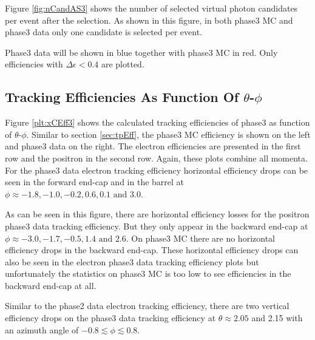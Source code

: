 \documentclass[a4paper,11pt,twosided,final,german,openbib,pdftex,listof=totoc,bibliography=totoc]{scrbook}
\begin{document}
Figure \ref{fig:nCandAS3} shows the number of selected virtual photon candidates per event after the selection. As shown in this figure, in both phase3 MC and phase3 data only one candidate is selected per event.




Phase3 data will be shown in blue together with phase3 MC in red. Only efficiencies with $\Delta \epsilon < 0.4$ are plotted.


\subsection{Tracking Efficiencies As Function Of $\theta$-$\phi$}
\label{sec:tpEff3}

Figure \ref{plt:xCEff3} shows the calculated tracking efficiencies of phase3 as function of $\theta$-$\phi$.
Similar to section \ref{sec:tpEff}, the phase3 MC efficiency is shown on the left and phase3 data on the right. The electron efficiencies are presented in the first row and the positron in the second row. Again, these plots combine all momenta. For the phase3 data electron tracking efficiency horizontal efficiency drops can be seen in the forward end-cap and in the barrel at $\phi \approx -1.8, -1.0, -0.2, 0.6, 0.1 \textrm{ and }3.0$. 

As can be seen in this figure, there are horizontal efficiency losses for the positron phase3 data tracking efficiency. But they only appear in the backward end-cap at $\phi \approx -3.0, -1.7, -0.5, 1.4 \textrm{ and } 2.6$. On phase3 MC there are no horizontal efficiency drops in the backward end-cap. These horizontal efficiency drops can also be seen in the electron phase3 data tracking efficiency plots but unfortunately the statistics on phase3 MC is too low to see efficiencies in the backward end-cap at all.

Similar to the phase2 data electron tracking efficiency, there are two vertical efficiency drops on the phase3 data tracking efficiency at $\theta \approx 2.05$ and 2.15 with an azimuth angle of $-0.8 \lesssim \phi \lesssim 0.8$.
\end{document}
